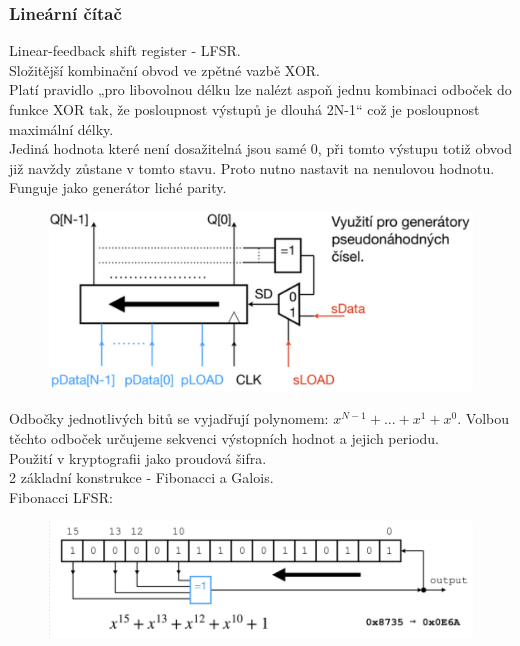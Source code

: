 \subsubsection{Lineární čítač}
Linear-feedback shift register - LFSR.\\
Složitější kombinační obvod ve zpětné vazbě XOR.\\
Platí pravidlo „pro libovolnou délku lze nalézt aspoň jednu kombinaci odboček do funkce XOR tak, že posloupnost výstupů je dlouhá 2N-1“ což je posloupnost maximální délky.\\
Jediná hodnota které není dosažitelná jsou samé 0, při tomto výstupu totiž obvod již navždy zůstane v tomto stavu. Proto nutno nastavit na nenulovou hodnotu.\\
Funguje jako generátor liché parity.\\
\begin{figure}[h!]
    \centering
    \includegraphics[scale = 0.4]{img/LSFR.png}
\end{figure}
\newpage
Odbočky jednotlivých bitů se vyjadřují polynomem: \(x^{N-1}+...+x^1+x^0\). Volbou těchto odboček určujeme sekvenci výstopních hodnot a jejich periodu.\\
Použití v kryptografii jako proudová šifra. \\
2 základní konstrukce - Fibonacci a Galois.\\
Fibonacci LFSR: \\
\begin{figure}[h!]
    \centering
    \includegraphics*[scale = 0.4]{img/Fibonacii.png}
\end{figure}

